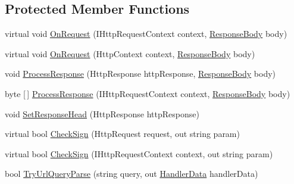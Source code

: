 \subsection*{Protected Member Functions}
\begin{DoxyCompactItemize}
\item 
virtual void \mbox{\hyperlink{class_t_net_1_1_sns_1_1_service_1_1_base_http_handler_a4b01de0bebb9b1cf6824f64125a8e352}{On\+Request}} (I\+Http\+Request\+Context context, \mbox{\hyperlink{class_t_net_1_1_sns_1_1_service_1_1_response_body}{Response\+Body}} body)
\item 
virtual void \mbox{\hyperlink{class_t_net_1_1_sns_1_1_service_1_1_base_http_handler_ad9df58a935f69c481e0b7e2e7b20900b}{On\+Request}} (Http\+Context context, \mbox{\hyperlink{class_t_net_1_1_sns_1_1_service_1_1_response_body}{Response\+Body}} body)
\item 
void \mbox{\hyperlink{class_t_net_1_1_sns_1_1_service_1_1_base_http_handler_a6dd0afc5a230965c534b1b572d3b4211}{Process\+Response}} (Http\+Response http\+Response, \mbox{\hyperlink{class_t_net_1_1_sns_1_1_service_1_1_response_body}{Response\+Body}} body)
\item 
byte \mbox{[}$\,$\mbox{]} \mbox{\hyperlink{class_t_net_1_1_sns_1_1_service_1_1_base_http_handler_a86da36f6ecc6db342fe0d123f9b68b37}{Process\+Response}} (I\+Http\+Request\+Context context, \mbox{\hyperlink{class_t_net_1_1_sns_1_1_service_1_1_response_body}{Response\+Body}} body)
\item 
void \mbox{\hyperlink{class_t_net_1_1_sns_1_1_service_1_1_base_http_handler_a2bdf1ead4d4eabcb1cccd47aee01819a}{Set\+Response\+Head}} (Http\+Response http\+Response)
\item 
virtual bool \mbox{\hyperlink{class_t_net_1_1_sns_1_1_service_1_1_base_http_handler_af83c27783bc3aefefb3e146a74d4f4eb}{Check\+Sign}} (Http\+Request request, out string param)
\item 
virtual bool \mbox{\hyperlink{class_t_net_1_1_sns_1_1_service_1_1_base_http_handler_afd502e27ed2724fc755cc3a2c58dfb73}{Check\+Sign}} (I\+Http\+Request\+Context context, out string param)
\item 
bool \mbox{\hyperlink{class_t_net_1_1_sns_1_1_service_1_1_base_http_handler_aa451fd4a14a0db7170290e889fa0a7f7}{Try\+Url\+Query\+Parse}} (string query, out \mbox{\hyperlink{class_t_net_1_1_sns_1_1_service_1_1_handler_data}{Handler\+Data}} handler\+Data)
\end{DoxyCompactItemize}
